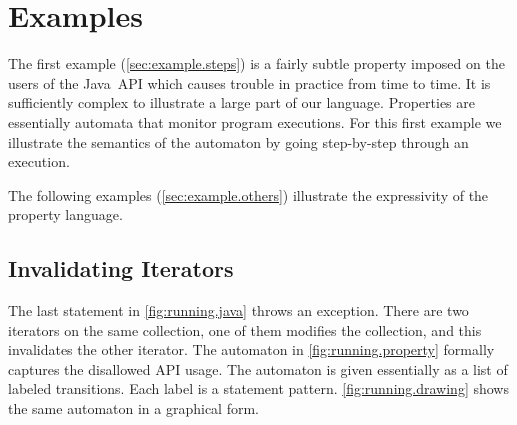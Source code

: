 \documentclass[preprint]{sigplanconf} %
\theoremstyle{definition}
\begin{document}
\section{Examples} \label{sec:example} %

The first example (\autoref{sec:example.steps}) is a fairly subtle property imposed on the users of the Java~API which causes trouble in practice from time to time.
It is sufficiently complex to illustrate a large part of our language.
Properties are essentially automata that monitor program executions.
For this first example we illustrate the semantics of the automaton by going step-by-step through an execution.

The following examples (\autoref{sec:example.others}) illustrate the expressivity of the property language.

\subsection{Invalidating Iterators} \label{sec:example.steps} %

The last statement in \autoref{fig:running.java} throws an exception.
There are two iterators on the same collection, one of them modifies the collection, and this invalidates the other iterator.
The automaton in \autoref{fig:running.property} formally captures the disallowed API usage.
The automaton is given essentially as a list of labeled transitions.
Each label is a statement pattern.
\autoref{fig:running.drawing} shows the same automaton in a graphical form.
\end{document}
